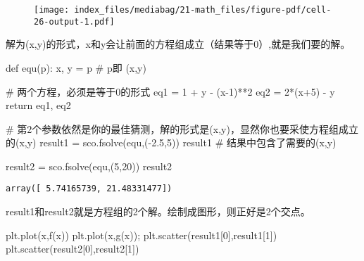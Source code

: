 \documentclass[
  letterpaper,
  DIV=11,
  numbers=noendperiod]{scrreprt}
\newenvironment{Shaded}{\begin{snugshade}}{\end{snugshade}}
\newcommand{\CommentTok}[1]{\textcolor[rgb]{0.37,0.37,0.37}{#1}}
\newcommand{\ControlFlowTok}[1]{\textcolor[rgb]{0.00,0.23,0.31}{#1}}
\newcommand{\DecValTok}[1]{\textcolor[rgb]{0.68,0.00,0.00}{#1}}
\newcommand{\FloatTok}[1]{\textcolor[rgb]{0.68,0.00,0.00}{#1}}
\newcommand{\KeywordTok}[1]{\textcolor[rgb]{0.00,0.23,0.31}{#1}}
\newcommand{\NormalTok}[1]{\textcolor[rgb]{0.00,0.23,0.31}{#1}}
\newcommand{\OperatorTok}[1]{\textcolor[rgb]{0.37,0.37,0.37}{#1}}
\begin{document}
\begin{figure}[H]

{\centering \texttt{[image: index\_files/mediabag/21-math\_files/figure-pdf/cell-26-output-1.pdf]}

}

\end{figure}

解为(x,y)的形式，x和y会让前面的方程组成立（结果等于0）,就是我们要的解。

\begin{Shaded}
\begin{Highlighting}[]
\KeywordTok{def}\NormalTok{ equ(p): }
\NormalTok{    x, y }\OperatorTok{=}\NormalTok{ p }\CommentTok{\# p即 (x,y)}

    \CommentTok{\# 两个方程，必须是等于0的形式}
\NormalTok{    eq1 }\OperatorTok{=} \DecValTok{1} \OperatorTok{+}\NormalTok{ y }\OperatorTok{{-}}\NormalTok{ (x}\OperatorTok{{-}}\DecValTok{1}\NormalTok{)}\OperatorTok{**}\DecValTok{2} 
\NormalTok{    eq2 }\OperatorTok{=} \DecValTok{2}\OperatorTok{*}\NormalTok{(x}\OperatorTok{+}\DecValTok{5}\NormalTok{) }\OperatorTok{{-}}\NormalTok{ y}
    \ControlFlowTok{return}\NormalTok{ eq1, eq2}

\CommentTok{\# 第2个参数依然是你的最佳猜测，解的形式是(x,y)，显然你也要采使方程组成立的(x,y)}
\NormalTok{result1 }\OperatorTok{=}\NormalTok{ sco.fsolve(equ,(}\OperatorTok{{-}}\FloatTok{2.5}\NormalTok{,}\DecValTok{5}\NormalTok{))}
\NormalTok{result1}
\CommentTok{\# 结果中包含了需要的(x,y)}

\NormalTok{result2 }\OperatorTok{=}\NormalTok{ sco.fsolve(equ,(}\DecValTok{5}\NormalTok{,}\DecValTok{20}\NormalTok{))}
\NormalTok{result2}
\end{Highlighting}
\end{Shaded}

\begin{verbatim}
array([ 5.74165739, 21.48331477])
\end{verbatim}

result1和result2就是方程组的2个解。绘制成图形，则正好是2个交点。

\begin{Shaded}
\begin{Highlighting}[]
\NormalTok{plt.plot(x,f(x))}
\NormalTok{plt.plot(x,g(x))}\OperatorTok{;}
\NormalTok{plt.scatter(result1[}\DecValTok{0}\NormalTok{],result1[}\DecValTok{1}\NormalTok{])}
\NormalTok{plt.scatter(result2[}\DecValTok{0}\NormalTok{],result2[}\DecValTok{1}\NormalTok{])}
\end{Highlighting}
\end{Shaded}
\end{document}
